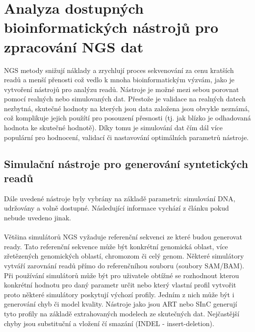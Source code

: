 \documentclass[czech,DP]{thesiskiv}
\numberwithin{equation}{section}
\begin{document}
\chapter{Analyza dostupných bioinformatických nástrojů pro zpracování NGS dat}
NGS metody snižují náklady a zrychlují proces sekvenování za cenu kratších readů a menší přenosti což vedlo k mnoha bioinformatickým výzvám, jako je vytvoření nástrojů pro analýzu readů. Nástroje je možné mezi sebou porovnat pomocí realných nebo simulovaných dat. Přestože je validace na realných datech nezbytná, skutečné hodnoty na kterých jsou data založena jsou obvykle neznámá, což komplikuje jejich použítí pro posouzení přesnosti (tj. jak blízko je odhadovaná hodnota ke skutečné hodnotě). Díky tomu je simulování dat čím dál více populární pro hodnocení, validací či nastavování optimálních parametrů nástroje. \cite{simulation_read}


\section{Simulační nástroje pro generování syntetických readů}
Dále uvedené nástroje byly vybrány na základě parametrů: simulování DNA, udržovány a volně dostupné. Následující informace vychází z článku \cite{simulation_read} pokud nebude uvedeno jinak.
\\
\\
Většina simulátorů NGS vyžaduje referenční sekvenci ze které budou generovat ready. Tato referenční sekvence může být konkrétní genomická oblast, více zřetězených genomických oblastí, chromozom či celý genom. Některé simulátory vytváří zarovnání readů přímo do referenčníhou souboru (soubory SAM/BAM). Při používání simulátorů může být pro uživatele obtížné se rozhodnout kterou konkrétní hodnotu pro daný parametr určit nebo který vlastní profil vytvořit proto některé simulátory poskytují výchozí profily. Jedním z nich může být i generování chyb či model kvality. Nástroje jako jsou ART nebo SInC generují tyto profily na základě extrahovaných modelech ze skutečných dat. Nejčastější chyby jsou substituční a vložení čí smazání (INDEL - insert-deletion).
\end{document}
